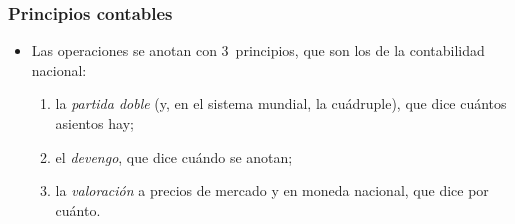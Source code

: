 \documentclass[11pt]{article}
\begin{document}
\subsubsection{Principios contables}\label{sec:principios}

\begin{itemize}
\item Las operaciones se anotan con 3~principios, que son los de la contabilidad nacional:
  \begin{enumerate}
  \item la \emph{partida doble} (y, en el sistema mundial, la cuádruple), que dice cuántos asientos hay;
  \item el \emph{devengo}, que dice cuándo se anotan;
  \item la \emph{valoración} a precios de mercado y en moneda nacional, que dice por cuánto.
  \end{enumerate}
\end{itemize}
\end{document}
